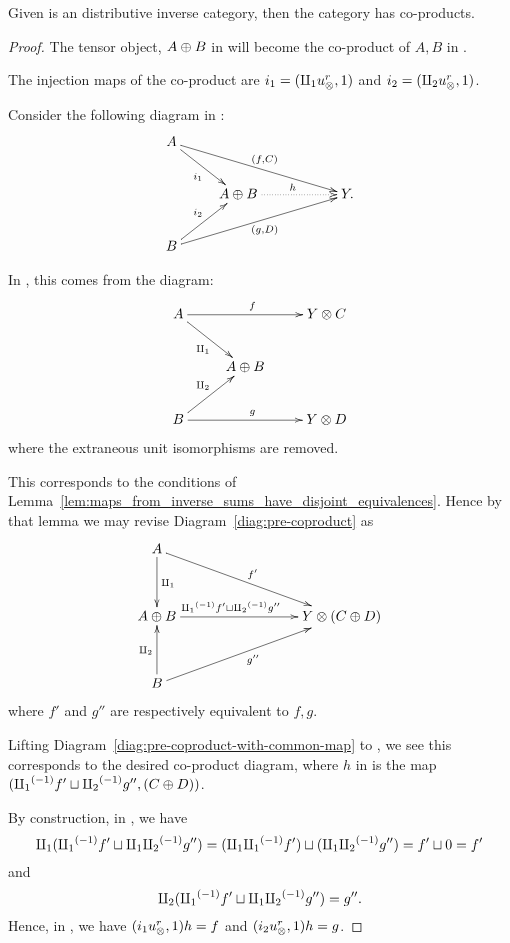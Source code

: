 \begin{proposition}\label{thm:x_tilde_has_coproducts_if_x_is_inverse_distributive_category}
  Given \X is an distributive inverse category, then the category \Xt has co-products.
\end{proposition}
\begin{proof}
  The tensor object, $A\oplus B$ in \X will become the co-product of $A, B$ in \Xt.

  The injection maps of the co-product are $i_1 =(\amalg_{1} u_{\otimes}^r, 1)$ and $i_2 = (\amalg_{2} u_{\otimes}^r, 1)$.

  Consider the following diagram in \Xt:
  \[
    \xymatrix{
      A \ar[drrr]^{(f,C)} \ar[dr]_{i_1} \\
      & A\+B \ar@{.>}[rr]^h & & Y. \\
      B \ar[urrr]_{(g,D)} \ar[ur]^{i_2}
    }
  \]

  In \X, this comes from the diagram:
  \begin{equation}
    \xymatrix{
      A \ar[dr]_{\cpa} \ar[rr]^f && Y\*C\\
      & A\+B\\
      B \ar[ur]^{\cpb} \ar[rr]^g && Y\*D\\
    }\label{diag:pre-coproduct}
  \end{equation}
  where the extraneous unit isomorphisms are removed.

  This corresponds to the conditions of
  Lemma~\ref{lem:maps_from_inverse_sums_have_disjoint_equivalences}. Hence by that lemma we may
  revise Diagram~\eqref{diag:pre-coproduct} as
  \begin{equation}
    \xymatrix@R+10pt {
      A \ar[d]^{\cpa} \ar[drrr]^{f'}\\
      A\+B \ar[rrr]^(.4){\icpa f' \djoin \icpb g''} &&& Y\*(C\+D)\\
      B \ar[u]^{\cpb} \ar[urrr]_{g''}\\
    }\label{diag:pre-coproduct-with-common-map}
  \end{equation}
  where $f'$ and $g''$ are respectively equivalent to $f,g$.

  Lifting Diagram~\ref{diag:pre-coproduct-with-common-map} to \X, we see this corresponds to the
  desired co-product diagram, where  $h$ in \Xt is the map $({\amalg_{1}}^{(-1)} f' \sqcup {\amalg_{2}}^{(-1)} g'', (C\oplus D))$.

  By construction, in \X, we have
  \[
    \amalg_{1} ({\amalg_{1}}^{(-1)} f' \sqcup \amalg_{1}{\amalg_{2}}^{(-1)} g'') = (\amalg_{1}{\amalg_{1}}^{(-1)} f') \sqcup (\amalg_{1}{\amalg_{2}}^{(-1)} g'') = f' \sqcup 0 = f'
  \]
  and
  \[
    \amalg_{2} ({\amalg_{1}}^{(-1)} f' \sqcup \amalg_{1}{\amalg_{2}}^{(-1)} g'') = g''.
  \]
  Hence, in \Xt, we have  $(i_1 u_{\otimes}^r, 1) h = f$ and $(i_2 u_{\otimes}^r, 1) h = g$.


\end{proof}
